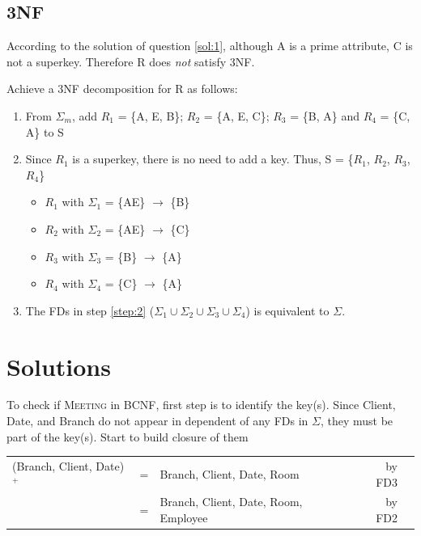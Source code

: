 \documentclass[12pt, a4paper]{article}
\begin{document}
\subsection{3NF}
According to the solution of question \ref{sol:1}, although A is a prime attribute, C is not a superkey. Therefore R does \emph{not} satisfy 3NF.

Achieve a 3NF decomposition for R as follows:
\begin{enumerate}[noitemsep]
\item From \(\Sigma_{m}\), add \(R_{1}\) = \{A, E, B\}; \(R_{2}\) = \{A, E, C\}; \(R_{3}\) = \{B, A\} and \(R_{4}\) = \{C, A\} to S
\item Since \(R_{1}\) is a superkey, there is no need to add a key. Thus, S = \{\(R_{1}\), \(R_{2}\), \(R_{3}\), \(R_{4}\)\} \label{step:2}

\begin{itemize}
\item \(R_{1}\) with \(\Sigma_{1}\) = \{AE\} \(\rightarrow\) \{B\}
\item \(R_{2}\) with \(\Sigma_{2}\) = \{AE\} \(\rightarrow\) \{C\}
\item \(R_{3}\) with \(\Sigma_{3}\) = \{B\} \(\rightarrow\) \{A\}
\item \(R_{4}\) with \(\Sigma_{4}\) = \{C\} \(\rightarrow\) \{A\}
\end{itemize}
\item The FDs in step \ref{step:2} (\(\Sigma_{1} \cup \Sigma_{2} \cup \Sigma_{3} \cup \Sigma_{4}\)) is equivalent to \(\Sigma\).
\end{enumerate}

\section{Solutions}
To check if \textsc{Meeting} in BCNF, first step is to identify the key(s).  Since Client, Date, and Branch do not appear in dependent of any FDs in \(\Sigma\), they must be part of the key(s).  Start to build closure of them

\vspace{2ex}
\hspace*{\fill}%
\begin{tabular}{l@{\hskip 0.1in}c@{\hskip 0.1in}l@{\hskip 0.5in}|r@{}p{3in}}
 (Branch, Client, Date)$^{+}$ & = & Branch, Client, Date, Room &  by FD3 \\
 & = & Branch, Client, Date, Room, Employee &  by FD2 \\
\end{tabular}%
\hspace*{\fill}
\vspace{2ex}
\end{document}
